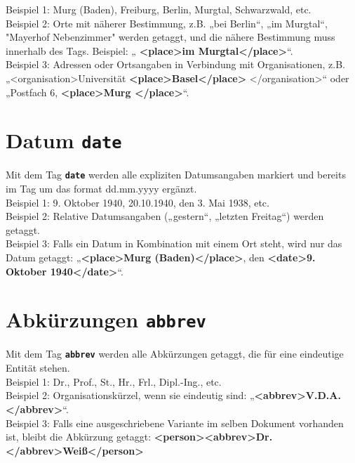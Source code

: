\documentclass{article}
\begin{document}
\noindent{} Beispiel 1: Murg (Baden), Freiburg, Berlin, Murgtal, Schwarzwald, etc.\\
 Beispiel 2: Orte mit näherer Bestimmung, z.B. „bei Berlin“, „im Murgtal“, "Mayerhof Nebenzimmer" werden getaggt, und die nähere Bestimmung muss innerhalb des Tags. Beispiel: „ \textbf{\textless place\textgreater  im Murgtal\textless /place\textgreater }“.\\
 Beispiel 3: Adressen oder Ortsangaben in Verbindung mit Organisationen, z.B. „\textless organisation\textgreater Universität \textbf{\textless place\textgreater  Basel\textless /place\textgreater} \textless /organisation\textgreater“ oder „Postfach 6, \textbf{\textless place\textgreater  Murg \textless /place\textgreater }“. \\

\section*{Datum \texttt{\texttt{\textbf{{\colorbox{date}{date}}}}}}


Mit dem Tag \texttt{\texttt{\texttt{\textbf{{\colorbox{date}{date}}}}}} werden alle expliziten Datumsangaben markiert und bereits im Tag um das format dd.mm.yyyy ergänzt.\\

\noindent{} Beispiel 1: 9. Oktober 1940, 20.10.1940, den 3. Mai 1938, etc.\\
 Beispiel 2: Relative Datumsangaben („gestern“, „letzten Freitag“) werden getaggt.\\
 Beispiel 3: Falls ein Datum in Kombination mit einem Ort steht, wird nur das Datum getaggt: „\textbf{\textless place\textgreater Murg (Baden)\textless /place\textgreater }, den \textbf{\textless date\textgreater 9. Oktober 1940\textless /date\textgreater }“. \\

\section*{Abkürzungen \texttt{\textbf{{\colorbox{abbrev}{abbrev}}}}}


Mit dem Tag \texttt{\texttt{\textbf{{\colorbox{abbrev}{abbrev}}}}} werden alle Abkürzungen getaggt, die für eine eindeutige Entität stehen. \\

\noindent{} Beispiel 1: Dr., Prof., St., Hr., Frl., Dipl.-Ing., etc.\\
 Beispiel 2: Organisationskürzel, wenn sie eindeutig sind: „\textbf{\textless abbrev\textgreater V.D.A.\textless /abbrev\textgreater }“.\\
 Beispiel 3: Falls eine ausgeschriebene Variante im selben Dokument vorhanden ist, bleibt die Abkürzung getaggt: \textbf{\textless person\textgreater \textless abbrev\textgreater Dr.\textless /abbrev\textgreater Weiß\textless /person\textgreater}
\end{document}

